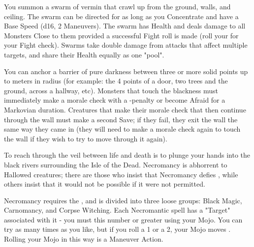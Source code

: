 {\MYSTERY [
  Name = Vermin Swarm,
  Link = arcana-mystery-vermin-swarm,
  Paradigm = Biomancy,
  Save = n/a,
  Duration = Concentration,
  Target = Close or Nearby
]

You summon a swarm of vermin that crawl up from the ground, walls, and ceiling.  The swarm can be directed for as long as you Concentrate and have a Base Speed (d16, 2 Maneuvers).  The swarm has \SUMDICE Health and deals \DICE damage to all Monsters Close to them provided a successful Fight roll is made (roll your \FOC for your Fight check).  Swarms take double damage from attacks that affect multiple targets, and share their Health equally as one "pool".  

\MYSTERY [
  Name = Wall of Gloom,
  Link = arcana-mystery-wall-of-gloom,
  Paradigm = Mind,
  Save = See Below,
  Duration = Markovian,
  Target = Nearby or Far-Away
]

You can anchor a barrier of pure darkness between three or more solid points up to \DICE meters in radius (for example: the 4 points of a door, two trees and the ground, across a hallway, etc).  Monsters that touch the blackness must immediately make a morale check with a -\DICE penalty or become Afraid for a Markovian duration.  Creatures that make their morale check that then continue through the wall must make a second Save; if they fail, they exit the wall the same way they came in (they will need to make a morale check again to touch the wall if they wish to try to move through it again).   






\newpage


To reach through the veil between life and death is to plunge your hands into the black rivers surrounding the Isle of the Dead.  Necromancy is abhorrent to Hallowed creatures; there are those who insist that Necromancy defies \TheAuthority, while others insist that it would not be possible if it were not permitted.  


Necromancy requires the , and is divided into three loose groups:  Black Magic, Carnomancy, and Corpse Witching.  Each Necromantic spell has a "Target" associated with it - you must this number or greater using your Mojo.  You can try as many times as you like, but if you roll a 1 or a 2, your Mojo moves \DCDOWN.  Rolling your Mojo in this way is a Maneuver Action.


}
